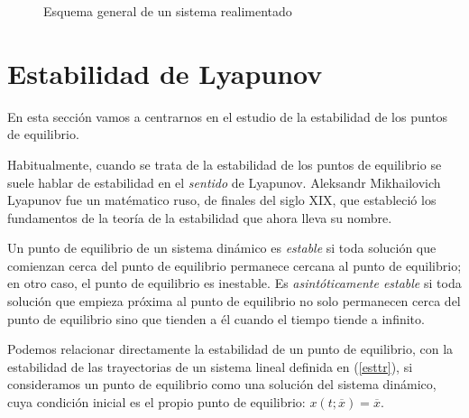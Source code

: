 \begin{figure}
\centering
{}

\caption{Esquema general de un sistema realimentado}\label{fig:rea}
\end{figure}

\section{Estabilidad de Lyapunov}
 En esta sección vamos a centrarnos en el estudio de la estabilidad de los puntos de equilibrio. 

Habitualmente, cuando se trata de la estabilidad de los puntos de equilibrio se suele hablar de estabilidad en el \emph{sentido} de Lyapunov. Aleksandr Mikhailovich Lyapunov fue un matématico ruso, de finales del siglo XIX, que estableció los fundamentos de la teoría de la estabilidad que ahora lleva su nombre.

Un punto de equilibrio de un sistema dinámico es \emph{estable} si toda  solución que comienzan cerca del punto de equilibrio permanece cercana al punto de equilibrio; en otro caso, el punto de equilibrio es inestable. Es \emph{asintóticamente estable} si toda solución que empieza próxima al punto de equilibrio no solo permanecen cerca del punto de equilibrio sino que tienden a él cuando el tiempo tiende a infinito.

Podemos relacionar directamente la estabilidad de un punto de equilibrio, con la estabilidad de las trayectorias de un sistema lineal definida en (\ref{esttr}), si consideramos  un punto de equilibrio como una solución del sistema dinámico, cuya condición inicial es el propio punto de equilibrio: $x(t;\overline x) = \overline x$.

